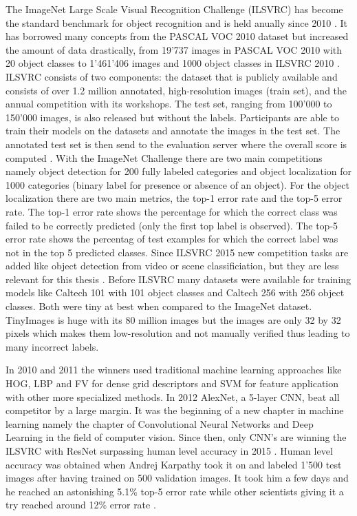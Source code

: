 The ImageNet Large Scale Visual Recognition Challenge (ILSVRC) has become the standard benchmark for object recognition and is held anually since 2010 \cite{imagenet}. It has borrowed many concepts from the PASCAL VOC 2010 dataset but increased the amount of data drastically, from 19'737 images in PASCAL VOC 2010 with 20 object classes to 1'461'406 images and 1000 object classes in ILSVRC 2010 \cite{everingham2010pascal, russakovsky2015imagenet}. ILSVRC consists of two components: the dataset that is publicly available and consists of over 1.2 million annotated, high-resolution images (train set), and the annual competition with its workshops. The test set, ranging from 100'000 to 150'000 images, is also released but without the labels. Participants are able to train their models on the datasets and annotate the images in the test set. The annotated test set is then send to the evaluation server where the overall score is computed \cite{russakovsky2015imagenet}. With the ImageNet Challenge there are two main competitions namely object detection for 200 fully labeled categories and object localization for 1000 categories (binary label for presence or absence of an object). For the object localization there are two main metrics, the top-1 error rate and the top-5 error rate. The top-1 error rate shows the percentage for which the correct class was failed to be correctly predicted (only the first top label is observed). The top-5 error rate shows the percentag of test examples for which the correct label was not in the top 5 predicted classes. Since ILSVRC 2015 new competition tasks are added like object detection from video or scene classificiation, but they are less relevant for this thesis \cite{imagenet2015}. Before ILSVRC many datasets were available for training models like Caltech 101 \cite{fei2007learning} with 101 object classes and Caltech 256 \cite{griffin2007caltech} with 256 object classes. Both were tiny at best when compared to the ImageNet dataset. TinyImages \cite{torralba200880} is huge with its 80 million images but the images are only 32 by 32 pixels which makes them low-resolution and not manually verified thus leading to many incorrect labels.

In 2010 and 2011 the winners used traditional machine learning approaches like HOG, LBP and FV for dense grid descriptors and SVM for feature application with other more specialized methods. In 2012 AlexNet, a 5-layer CNN, beat all competitor by a large margin. It was the beginning of a new chapter in machine learning namely the chapter of Convolutional Neural Networks and Deep Learning in the field of computer vision. Since then, only CNN's are winning the ILSVRC with ResNet surpassing human level accuracy in 2015 \cite{he2016deep}. Human level accuracy was obtained when Andrej Karpathy took it on and labeled 1'500 test images after having trained on 500 validation images. It took him a few days and he reached an astonishing 5.1\% top-5 error rate while other scientists giving it a try reached around 12\% error rate \cite{humanlevel2014}.


